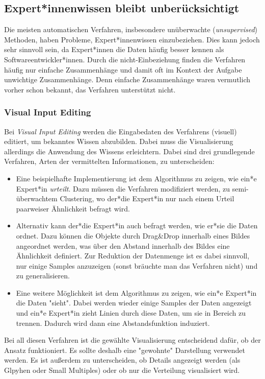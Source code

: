 		\subsection{Expert*innenwissen bleibt unberücksichtigt}
			Die meisten automatischen Verfahren, insbesondere unüberwachte (\emph{unsupervised}) Methoden, haben Probleme, Expert*innenwissen einzubeziehen. Dies kann jedoch sehr sinnvoll sein, da Expert*innen die Daten häufig besser kennen als Softwareentwickler*innen. Durch die nicht-Einbeziehung finden die Verfahren häufig nur einfache Zusammenhänge und damit oft im Kontext der Aufgabe unwichtige Zusammenhänge. Denn einfache Zusammenhänge waren vermutlich vorher schon bekannt, \dh das Verfahren unterstützt nicht.

			\subsubsection{Visual Input Editing}
				Bei \emph{Visual Input Editing} werden die Eingabedaten des Verfahrens (visuell) editiert, um bekanntes Wissen abzubilden. Dabei muss die Visualisierung allerdings die Anwendung des Wissens erleichtern. Dabei sind drei grundlegende Verfahren, \bzw Arten der vermittelten Informationen, zu unterscheiden:
				\begin{itemize}
					\item Eine beispielhafte Implementierung ist dem Algorithmus zu zeigen, wie ein*e Expert*in \emph{urteilt}. Dazu müssen die Verfahren modifiziert werden, \bspw zu semi-überwachtem Clustering, wo der*die Expert*in nur nach einem Urteil \bzgl paarweiser Ähnlichkeit befragt wird.
					\item Alternativ kann der*die Expert*in auch befragt werden, wie er*sie die Daten ordnet. Dazu können die Objekte \bspw durch Drag\&Drop innerhalb eines Bildes angeordnet werden, was über den Abstand innerhalb des Bildes eine Ähnlichkeit definiert. Zur Reduktion der Datenmenge ist es dabei sinnvoll, nur einige Samples anzuzeigen (sonst bräuchte man das Verfahren nicht) und zu generalisieren.
					\item Eine weitere Möglichkeit ist dem Algorithmus zu zeigen, wie ein*e Expert*in die Daten "sieht". Dabei werden wieder einige Samples der Daten angezeigt und ein*e Expert*in zieht Linien durch diese Daten, um sie in Bereich zu trennen. Dadurch wird dann eine Abstandsfunktion induziert.
				\end{itemize}
				Bei all diesen Verfahren ist die gewählte Visualisierung entscheidend dafür, ob der Ansatz funktioniert. Es sollte deshalb eine "gewohnte" Darstellung verwendet werden. Es ist außerdem zu unterscheiden, ob Details angezeigt werden (\bspw als Glpyhen oder Small Multiples) oder ob nur die Verteilung visualisiert wird.

